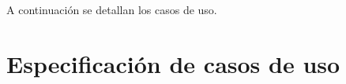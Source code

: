 A continuación se detallan los casos de uso.

\section{Especificación de casos de uso }



\newpage


\newpage


\newpage


\newpage


\newpage


\newpage


\newpage


\newpage


\newpage


\newpage


\newpage


\newpage


\newpage


\newpage


\newpage

%
\newpage


\newpage


\newpage


\newpage


\newpage


\newpage


\newpage


\newpage


\newpage


\newpage


\newpage


\newpage


\newpage


\newpage


\newpage


\newpage


\newpage


\newpage


\newpage






